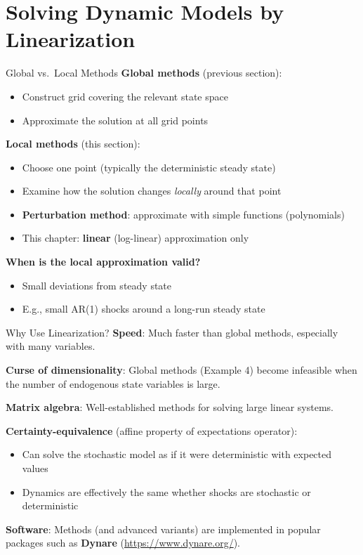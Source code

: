 \documentclass[blue]{beamer}
\begin{document}
\section{Solving Dynamic Models by Linearization}

\begin{frame}{Global vs.\ Local Methods}
	\textbf{Global methods} (previous section):
	\begin{itemize}
		\item Construct grid covering the relevant state space
		\item Approximate the solution at all grid points
	\end{itemize}
	
	\textbf{Local methods} (this section):
	\begin{itemize}
		\item Choose one point (typically the deterministic steady state)
		\item Examine how the solution changes \emph{locally} around that point
		\item \textbf{Perturbation method}: approximate with simple functions (polynomials)
		\item This chapter: \textbf{linear} (log-linear) approximation only
	\end{itemize}
	
	\bigskip
	\textbf{When is the local approximation valid?}
	\begin{itemize}
		\item Small deviations from steady state
		\item E.g., small AR(1) shocks around a long-run steady state
	\end{itemize}
\end{frame}


\begin{frame}{Why Use Linearization?}
	\textbf{Speed}: Much faster than global methods, especially with many variables.
	
	\bigskip
	\textbf{Curse of dimensionality}: Global methods (Example 4) become infeasible when the number of endogenous state variables is large.
	
	\bigskip
	\textbf{Matrix algebra}: Well-established methods for solving large linear systems.
	
	\bigskip
	\textbf{Certainty-equivalence} (affine property of expectations operator):
	\begin{itemize}
		\item Can solve the stochastic model as if it were deterministic with expected values
		\item Dynamics are effectively the same whether shocks are stochastic or deterministic
	\end{itemize}
	
	\bigskip
	\textbf{Software}: Methods (and advanced variants) are implemented in popular packages such as \textbf{Dynare} (\url{https://www.dynare.org/}).
\end{frame}
\end{document}
